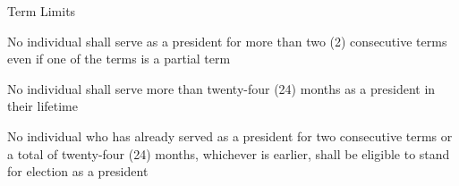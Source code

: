 
     \item{Term Limits}
     \begin{longenum}[label*=\arabic*., align=left]
     \item No individual shall serve as a president for more than two (2) consecutive terms even if one of the terms is a partial term
     \item No individual shall serve more than twenty-four (24) months as a president in their lifetime
     \item No individual who has already served as a president for two consecutive terms or a total of twenty-four (24) months, whichever is earlier, shall be eligible to stand for election as a president
      \end{longenum}
